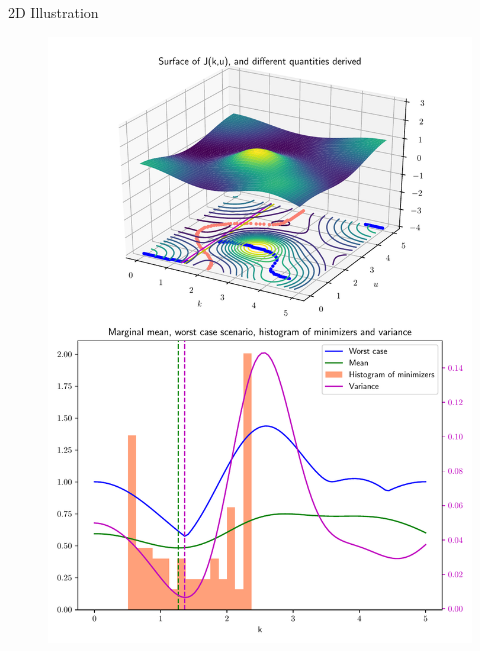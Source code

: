 \message{ !name(beamer_poster_2col.tex)}\documentclass{beamer}
\newlength{\sndcolwid}
\DeclareMathOperator*{\argmax}{arg\,max}
\newcommand{\yobs}{\bm{y}_{\mathrm{obs}}}
\newcommand{\kest}{\hat{\bm{k}}}
\begin{document}
\begin{frame}[t]
\begin{columns}[t]
\begin{column}{\sndcolwid}
\begin{block}{2D Illustration}
    \begin{figure}[!h]
      \centering
      \includegraphics[width = .85\linewidth]{surface_transp_vert}
    \end{figure}
  \end{block}

  
 



\end{column}
\end{columns}
\end{frame}
\end{document}
